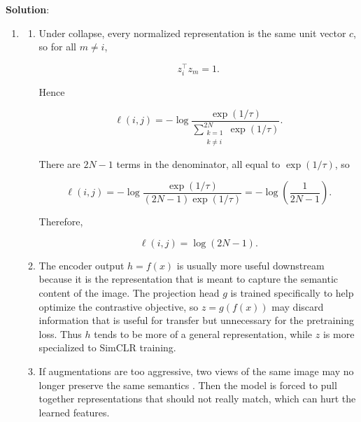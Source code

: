 \documentclass[submit]{harvardml}
\newenvironment{solution}{%
    \vspace{2mm}\color{blue}\noindent\textbf{Solution}:\ }
{}
\begin{document}
\begin{solution}
\begin{enumerate}
\begin{enumerate}
If the most similar sample is a hard negative, it receives nearly all the weight, while the rest receive
almost zero weight. This creates very steep gradients and makes training unstable.

As \(\tau \to \infty\), we have

\[
\frac{z_i^\top z_k}{\tau} \to 0
\]

for all \(k\), so

\[
\exp\left(z_i^\top z_k / \tau\right) \approx 1.
\]

Thus all samples receive nearly equal weight:

\[
w_k \approx \frac{1}{2N-1}.
\]


An intermediate temperature is preferred because it balances these two edge cases in the sense that it gives higher
weight to informative hard negatives without making the optimization too unstable. This provides
useful gradients while maintaining stable training.
	    \end{enumerate}
        \item \begin{enumerate}
            \item Under collapse, every normalized representation is the same unit vector \(c\), so for all
\(m \neq i\),

\[
z_i^\top z_m = 1.
\]

Hence

\[
\ell(i,j)
=
-\log
\frac{\exp(1/\tau)}
{\sum_{\substack{k=1\\k\neq i}}^{2N}\exp(1/\tau)}.
\]

There are \(2N-1\) terms in the denominator, all equal to \(\exp(1/\tau)\), so

\[
\ell(i,j)
=
-\log
\frac{\exp(1/\tau)}
{(2N-1)\exp(1/\tau)}
=
-\log\left(\frac{1}{2N-1}\right).
\]

Therefore,

\[
\boxed{\ell(i,j)=\log(2N-1).}
\]
            \item The encoder output \(h=f(x)\) is usually more useful downstream because it is the
representation that is meant to capture the semantic content of the image. The projection head \(g\)
is trained specifically to help optimize the contrastive objective, so \(z=g(f(x))\) may discard
information that is useful for transfer but unnecessary for the pretraining loss. Thus \(h\) tends to
be more of a general representation, while \(z\) is more specialized to SimCLR training.
            \item If augmentations are too aggressive, two views of the same image may no longer preserve
the same semantics . Then the model is forced to pull together representations that should not
really match, which can hurt the learned features.


\end{enumerate}
\end{enumerate}
\end{solution}
\end{document}
